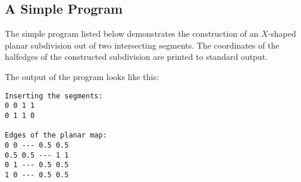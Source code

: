 

\subsection{A Simple Program}
\label{ssec:example1}
The simple program listed below demonstrates the construction of an
$X$-shaped planar subdivision out of two intersecting segments.
The coordinates of the halfedges of the constructed subdivision are
printed to standard output.


The output of the program looks like this:
\begin{verbatim}
Inserting the segments:
0 0 1 1
0 1 1 0

Edges of the planar map:
0 0 --- 0.5 0.5
0.5 0.5 --- 1 1
0 1 --- 0.5 0.5
1 0 --- 0.5 0.5
\end{verbatim}



